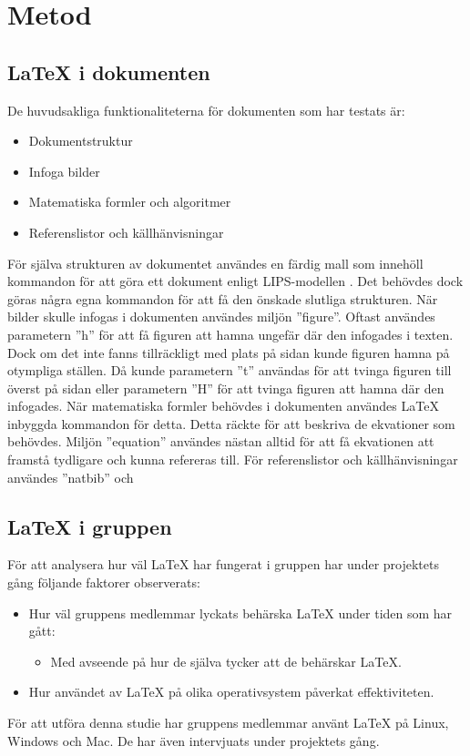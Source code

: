 \section{Metod}  

\subsection{{\LaTeX} i dokumenten}
De huvudsakliga funktionaliteterna för dokumenten som har testats är: 
\begin{itemize}
\item Dokumentstruktur
\item Infoga bilder
\item Matematiska formler och algoritmer
\item Referenslistor och källhänvisningar
\end{itemize}   
För själva strukturen av dokumentet användes en färdig mall som innehöll kommandon för att göra ett dokument enligt LIPS-modellen \citep{lips}. Det behövdes dock göras några egna kommandon för att få den önskade slutliga strukturen.
\newline
\newline
När bilder skulle infogas i dokumenten användes miljön ''figure''. Oftast användes parametern ''h'' för att få figuren att hamna ungefär där den infogades i texten. Dock om det inte fanns tillräckligt med plats på sidan kunde figuren hamna på otympliga ställen. Då kunde parametern ''t'' användas för att tvinga figuren till överst på sidan eller parametern ''H'' för att tvinga figuren att hamna där den infogades.   
\newline
\newline
När matematiska formler behövdes i dokumenten användes {\LaTeX} inbyggda kommandon för detta. Detta räckte för att beskriva de ekvationer som behövdes. Miljön ''equation'' användes nästan alltid för att få ekvationen att framstå tydligare och kunna refereras till. 
\newline
\newline
För referenslistor och källhänvisningar användes ''natbib'' och     
\subsection{{\LaTeX} i gruppen}
För att analysera hur väl {\LaTeX} har fungerat i gruppen har under projektets gång följande faktorer observerats:   
\begin{itemize}
	\item Hur väl gruppens medlemmar lyckats behärska {\LaTeX} under tiden som har gått:
	\begin{itemize}
		\item Med avseende på hur de själva tycker att de behärskar {\LaTeX}. 
	\end{itemize}
	\item Hur användet av {\LaTeX} på olika operativsystem påverkat effektiviteten.
\end{itemize} 
För att utföra denna studie har gruppens medlemmar använt {\LaTeX} på Linux, Windows och Mac. De har även intervjuats under projektets gång.   
